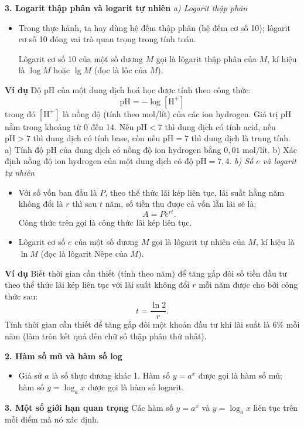 \documentclass[12pt,a4paper]{extarticle}
\begin{document}
\noindent\textbf{3. Logarit thập phân và logarit tự nhiên}
\vspace{0.2cm}
\noindent\textit{a) Logarit thập phân}
\begin{itemize}
    \item Trong thực hành, ta hay dùng hệ đếm thập phân (hệ đếm cơ số 10); lôgarit cơ số 10 đóng vai trò quan trọng trong tính toán.
    
    Lôgarit cơ số 10 của một số dương $M$ gọi là lôgarit thập phân của $M$, kí hiệu là $\log M$ hoặc $\lg M$ (đọc là lốc của $M$).
\end{itemize}
\noindent\textbf{Ví dụ} Độ $\text{pH}$ của một dung dịch hoá học được tính theo công thức:
\[ \text{pH} = -\log[\text{H}^+] \]
trong đó $[\text{H}^+]$ là nồng độ (tính theo mol/lít) của các ion hydrogen. Giá trị $\text{pH}$ nằm trong khoảng từ 0 đến 14. Nếu $\text{pH} < 7$ thì dung dịch có tính acid, nếu $\text{pH} > 7$ thì dung dịch có tính base, còn nếu $\text{pH} = 7$ thì dung dịch là trung tính.
\noindent a) Tính độ $\text{pH}$ của dung dịch có nồng độ ion hydrogen bằng $0{,}01\text{ mol/lít}$.
\noindent b) Xác định nồng độ ion hydrogen của một dung dịch có độ $\text{pH} = 7{,}4$.
\vspace{0.4cm}
\noindent\textit{b) Số $e$ và logarit tự nhiên}
\begin{itemize}
    \item Với số vốn ban đầu là $P$, theo thể thức lãi kép liên tục, lãi suất hằng năm không đổi là $r$ thì sau $t$ năm, số tiền thu được cả vốn lẫn lãi sẽ là:
    \[ A = P e^{rt}. \]
    Công thức trên gọi là công thức lãi kép liên tục.
    \item Lôgarit cơ số $e$ của một số dương $M$ gọi là lôgarit tự nhiên của $M$, kí hiệu là $\ln M$ (đọc là lôgarit Nêpe của $M$).
\end{itemize}
\noindent\textbf{Ví dụ} Biết thời gian cần thiết (tính theo năm) để tăng gấp đôi số tiền đầu tư theo thể thức lãi kép liên tục với lãi suất không đổi $r$ mỗi năm được cho bởi công thức sau:
\[ t = \frac{\ln 2}{r}. \]
Tính thời gian cần thiết để tăng gấp đôi một khoản đầu tư khi lãi suất là $6\%$ mỗi năm (làm tròn kết quả đến chữ số thập phân thứ nhất).

\noindent\textbf{2. Hàm số mũ và hàm số log}
\begin{itemize}
    \item Giả sử $a$ là số thực dương khác 1. Hàm số $y = a^x$ được gọi là hàm số mũ; hàm số $y = \log_a x$ được gọi là hàm số logarit.
\end{itemize}
\noindent\textbf{3. Một số giới hạn quan trọng}
\noindent Các hàm số $y = a^x$ và $y = \log_a x$ liên tục trên mỗi điểm mà nó xác định.
\vspace{0.2cm}
\end{document}
